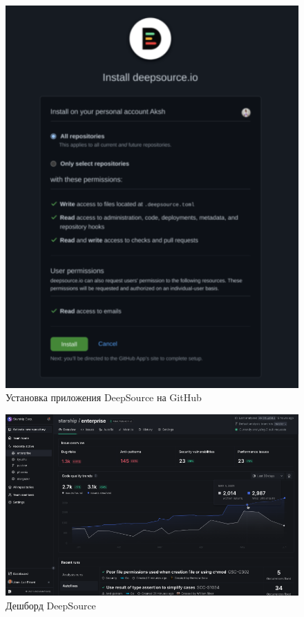 \documentclass[%
	11pt,
	a4paper,
	utf8,
		]{article}
\begin{document}
\begin{figure}[h]
	\centering
	\includegraphics[scale=1.55]{figures/deepsource.png}
	\caption{ Установка приложения DeepSource на GitHub }\label{fig:deepsource}
\end{figure}

\begin{figure}[t!]
	\centering
	\includegraphics[scale=1.15]{figures/deepsource-dash.png}
	\caption{ Дешборд DeepSource }\label{fig:deepsource-dash}
\end{figure}
\end{document}
